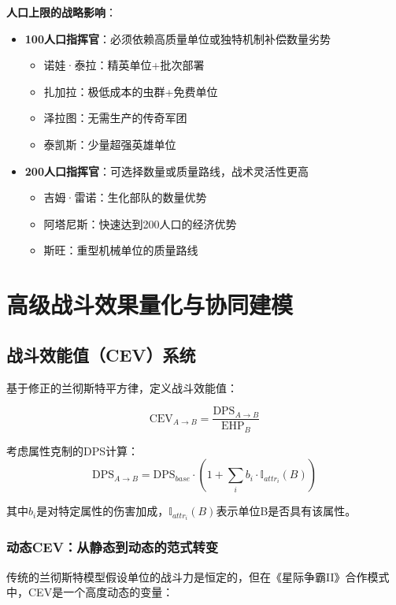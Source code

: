 \documentclass[a4paper,12pt]{article}
\begin{document}
\textbf{人口上限的战略影响}：
\begin{itemize}
\item \textbf{100人口指挥官}：必须依赖高质量单位或独特机制补偿数量劣势
  \begin{itemize}
  \item 诺娃·泰拉：精英单位+批次部署
  \item 扎加拉：极低成本的虫群+免费单位
  \item 泽拉图：无需生产的传奇军团
  \item 泰凯斯：少量超强英雄单位
  \end{itemize}
\item \textbf{200人口指挥官}：可选择数量或质量路线，战术灵活性更高
  \begin{itemize}
  \item 吉姆·雷诺：生化部队的数量优势
  \item 阿塔尼斯：快速达到200人口的经济优势
  \item 斯旺：重型机械单位的质量路线
  \end{itemize}
\end{itemize}

\section{高级战斗效果量化与协同建模}

\subsection{战斗效能值（CEV）系统}
基于修正的兰彻斯特平方律，定义战斗效能值：

\begin{equation}
\text{CEV}_{A \rightarrow B} = \frac{\text{DPS}_{A \rightarrow B}}{\text{EHP}_B}
\end{equation}

考虑属性克制的DPS计算：
\begin{equation}
\text{DPS}_{A \rightarrow B} = \text{DPS}_{base} \cdot (1 + \sum_i b_i \cdot \mathbb{I}_{attr_i}(B))
\end{equation}

其中$b_i$是对特定属性的伤害加成，$\mathbb{I}_{attr_i}(B)$表示单位B是否具有该属性。

\subsubsection{动态CEV：从静态到动态的范式转变}
传统的兰彻斯特模型假设单位的战斗力是恒定的，但在《星际争霸II》合作模式中，CEV是一个高度动态的变量：
\end{document}
